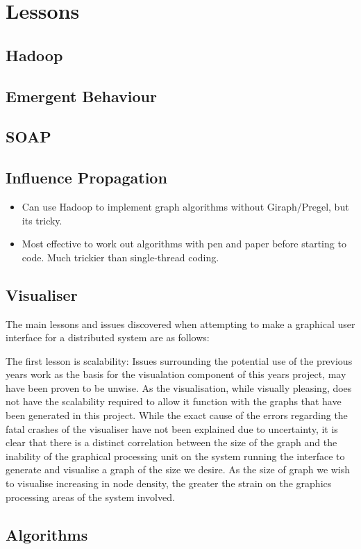 \section{Lessons}


\subsection{Hadoop}

\subsection{Emergent Behaviour}

\subsection{SOAP}

\subsection{Influence Propagation}

\begin{itemize}
	\item Can use Hadoop to implement graph algorithms without Giraph/Pregel, but its tricky.
	\item Most effective to work out algorithms with pen and paper before starting to code. Much trickier than single-thread coding.
\end{itemize}

\subsection{Visualiser}

The main lessons and issues discovered when attempting to make a graphical user interface for a distributed system are as follows:

The first lesson is scalability:
Issues surrounding the potential use of the previous years work as the basis for the visualation component of this years project, may have been proven to be unwise. As the visualisation, while visually pleasing, does not have the scalability required to allow it function with the graphs that have been generated in this project. While the exact cause of the errors regarding the fatal crashes of the visualiser have not been explained due to uncertainty, it is clear that there is a distinct correlation between the size of the graph and the inability of the graphical processing unit on the system running the interface to generate and visualise a graph of the size we desire. As the size of graph we wish to visualise increasing in node density, the greater the strain on the graphics processing areas of the system involved.

\subsection{Algorithms}

